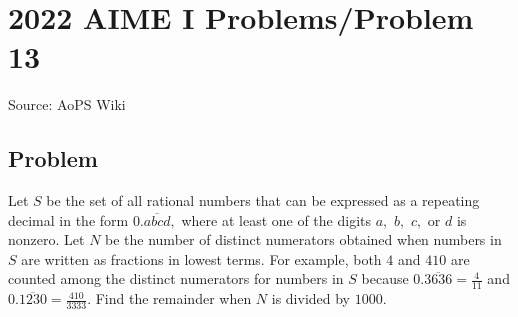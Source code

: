 \documentclass[12pt]{article}
\begin{document}
\section*{{2022 AIME I Problems/Problem 13}}
Source: AoPS Wiki

\subsection*{Problem}
Let $S$ be the set of all rational numbers that can be expressed as a repeating decimal in the form $0.\overline{abcd},$ where at least one of the digits $a,$ $b,$ $c,$ or $d$ is nonzero. Let $N$ be the number of distinct numerators obtained when numbers in $S$ are written as fractions in lowest terms. For example, both $4$ and $410$ are counted among the distinct numerators for numbers in $S$ because $0.\overline{3636} = \frac{4}{11}$ and $0.\overline{1230} = \frac{410}{3333}.$ Find the remainder when $N$ is divided by $1000.$
\end{document}
